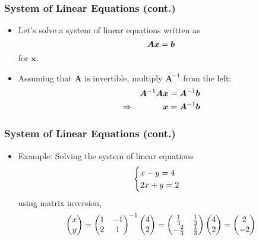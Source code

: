 \documentclass[pdflatex, 12pt]{beamer}
\begin{document}
\begin{frame}
\frametitle{System of Linear Equations (cont.)}
\begin{itemize}
\item Let's solve a system of linear equations written as 
 \begin{equation}
 \bm{Ax} = \bm{b} \notag 
 \end{equation}
for $\bm{x}$.
\vspace{0.4cm}
\item Assuming that $\bm{A}$ is invertible, multiply $\bm{A}^{-1}$ from the left:
 \begin{eqnarray}
 && \bm{A}^{-1}\bm{Ax} = \bm{A}^{-1}\bm{b} \notag \\
 &\Rightarrow& \bm{x} = \bm{A}^{-1}\bm{b} \notag
 \end{eqnarray}
\end{itemize}
\end{frame}

\begin{frame}
\frametitle{System of Linear Equations (cont.)}
\begin{itemize}
\item Example: Solving the system of linear equations
 \begin{eqnarray}
 \begin{cases}
 x - y = 4 \\
 2x + y = 2 \notag
 \end{cases}
 \end{eqnarray}
using matrix inversion,
 \begin{equation}
 \begin{pmatrix}
 x \\
 y \\
 \end{pmatrix} = \begin{pmatrix}
 1 & -1 \\
 2 & 1 \\
 \end{pmatrix}^{-1} \begin{pmatrix}
 4 \\
 2 \\
 \end{pmatrix} = \begin{pmatrix}
 \frac{1}{3} & \frac{1}{3} \\
 -\frac{2}{3} & \frac{1}{3} \\
 \end{pmatrix} \begin{pmatrix}
 4 \\
 2 \\
 \end{pmatrix} = \begin{pmatrix}
 2 \\
 -2 \\
 \end{pmatrix} \notag
 \end{equation}
\end{itemize}
\end{frame}
\end{document}
